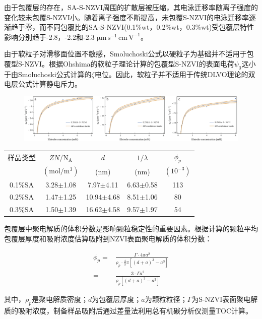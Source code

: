 由于包覆层的存在，SA-S-NZVI周围的扩散层被压缩，其电泳迁移率随离子强度的变化较未包覆S-NZVI小。随着离子强度不断提高，未包覆S-NZVI的电泳迁移率逐渐趋于零，而不同包覆比的SA-S-NZVI(0.1\%wt，0.2\%wt，0.3\%wt)受包覆层特性影响分别趋于-2.8，-2.2和-2.3 $\mathrm{\mu m\, s^{-1}\, cm\,V^{-1}} $。

由于软粒子对滑移面位置不敏感\cite{1992Electrophoretic}，Smoluchoski公式以硬粒子为基础并不适用于包覆型S-NZVI。根据Ohshima的软粒子理论计算的包覆型S-NZVI的表面电荷$\psi_0$远小于由Smoluchoski公式计算的$\zeta$电位。因此，软粒子并不适用于传统DLVO理论的双电层公式计算静电斥力。

\begin{figure}[h]
    \centering
    \includegraphics[scale=0.45]{figs/fig5.pdf}
    \label{fig5}
\end{figure}

\begin{table}
    \centering
    \label{tb1}
    \begin{tabular}{@{}ccccc@{}}
        \toprule
         样品类型 & $ZN$/$\mathrm{N_A}$& $d$ & $1/\lambda$ &$\phi_p$\\
           &$(\mathrm{mol/m^3})$&(nm)&(nm)& $(10^{-3})$ \\
        \midrule
        0.1\%SA & 3.28$\pm$1.08 & 7.97$\pm$4.11 & 6.63$\pm$0.58 & 113\\
        0.2\%SA & 1.47$\pm$1.25 & 10.94$\pm$4.68 & 8.51$\pm$1.06 & 80\\
        0.3\%SA & 1.50$\pm$1.39 & 16.62$\pm$4.58 & 9.57$\pm$1.97 & 54\\
        \bottomrule
    \end{tabular}
\end{table}


包覆层中聚电解质的体积分数是影响颗粒稳定性的重要因素。根据计算的颗粒平均包覆层厚度和吸附浓度估算吸附到NZVI表面聚电解质的体积分数：

\begin{align}
    \phi_p=& \frac{\Gamma\cdot 4\pi a^2}{\rho_p\cdot \frac{4}{3}\pi [(d+a)^3-a^3]}  \\
    =&\frac{3\cdot\Gamma a^2}{\rho_p[(d+a)^3-a^3]} \nonumber
\end{align}

其中，$\rho_p$是聚电解质密度；$d$为包覆层厚度；$a$为颗粒粒径；$\Gamma$为S-NZVI表面聚电解质的吸附浓度，制备样品吸附后通过差量法利用总有机碳分析仪测量TOC计算。

